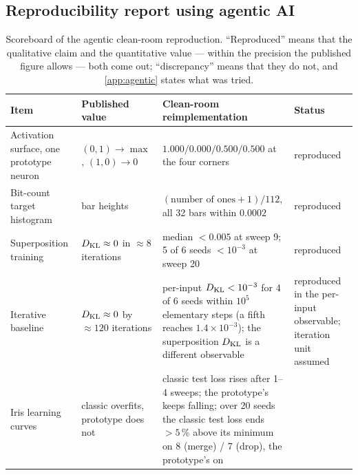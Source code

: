 
\subsection{Reproducibility report using agentic AI}
\label{sec:agentic}

\begin{table}[t]
\caption{Scoreboard of the agentic clean-room reproduction.  ``Reproduced'' means that the
qualitative claim and the quantitative value --- within the precision the published figure
allows --- both come out; ``discrepancy'' means that they do not, and
\cref{app:agentic} states what was tried.}
\label{tab:agentic-scoreboard}
\footnotesize
\begin{tabularx}{\textwidth}{@{}>{\raggedright\arraybackslash}p{}
                              >{\raggedright\arraybackslash}p{}
                              X
                              >{\raggedright\arraybackslash}p{}@{}}
\toprule
Item & Published value & Clean-room reimplementation & Status \\
\midrule
Activation surface, one prototype neuron & $(0,1)\!\to\!\max$, $(1,0)\!\to\!0$ &
  $1.000 / 0.000 / 0.500 / 0.500$ at the four corners & reproduced \\
Bit-count target histogram &
  bar heights &
  $(\text{number of ones}+1)/112$, all 32 bars within $0.0002$ & reproduced \\
Superposition training &
  $D_{\mathrm{KL}}\approx 0$ in $\approx 8$ iterations &
  median $<0.005$ at sweep 9; 5 of 6 seeds $<10^{-3}$ at sweep 20 & reproduced \\
Iterative baseline &
  $D_{\mathrm{KL}}\approx 0$ by $\approx 120$ iterations &
  per-input $D_{\mathrm{KL}}<10^{-3}$ for 4 of 6 seeds within $10^5$ elementary steps (a fifth reaches
  $1.4\times10^{-3}$); the superposition $D_{\mathrm{KL}}$ is a different observable & reproduced in the per-input observable; iteration unit
  assumed \\
Iris learning curves &
  classic overfits, prototype does not &
  classic test loss rises after 1--4 sweeps; the prototype's keeps falling; over 20 seeds the
  classic test loss ends $>5\,\%$ above its minimum on 8 (merge) / 7 (drop), the prototype's on

\end{tabularx}
\end{table}
